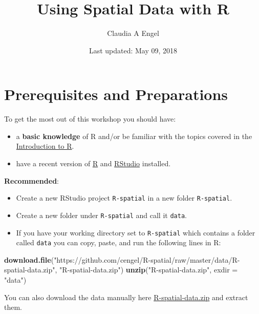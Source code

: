\documentclass[]{book}
\title{Using Spatial Data with R}
\author{Claudia A Engel}
\date{Last updated: May 09, 2018}
\newenvironment{Shaded}{\begin{snugshade}}{\end{snugshade}}
\newcommand{\KeywordTok}[1]{\textcolor[rgb]{0.13,0.29,0.53}{\textbf{#1}}}
\newcommand{\DataTypeTok}[1]{\textcolor[rgb]{0.13,0.29,0.53}{#1}}
\newcommand{\StringTok}[1]{\textcolor[rgb]{0.31,0.60,0.02}{#1}}
\newcommand{\NormalTok}[1]{#1}
\providecommand{\tightlist}{%
  \setlength{\itemsep}{0pt}\setlength{\parskip}{0pt}}
\theoremstyle{definition}
\theoremstyle{definition}
\theoremstyle{definition}
\theoremstyle{remark}
\begin{document}
\maketitle

{
\setcounter{tocdepth}{1}
\tableofcontents
}
\chapter*{Prerequisites and
Preparations}\label{prerequisites-and-preparations}

To get the most out of this workshop you should have:

\begin{itemize}
\tightlist
\item
  a \textbf{basic knowledge} of R and/or be familiar with the topics
  covered in the \href{https://cengel.github.io/R-intro/}{Introduction
  to R}.
\item
  have a recent version of \href{https://cran.r-project.org/}{R} and
  \href{https://www.rstudio.com/}{RStudio} installed.
\end{itemize}

\textbf{Recommended}:

\begin{itemize}
\item
  Create a new RStudio project \texttt{R-spatial} in a new folder
  \texttt{R-spatial}.
\item
  Create a new folder under \texttt{R-spatial} and call it
  \texttt{data}.
\item
  If you have your working directory set to \texttt{R-spatial} which
  contains a folder called \texttt{data} you can copy, paste, and run
  the following lines in R:
\end{itemize}

\begin{Shaded}
\begin{Highlighting}[]
\KeywordTok{download.file}\NormalTok{(}\StringTok{"https://github.com/cengel/R-spatial/raw/master/data/R-spatial-data.zip"}\NormalTok{, }
              \StringTok{"R-spatial-data.zip"}\NormalTok{)}
\KeywordTok{unzip}\NormalTok{(}\StringTok{"R-spatial-data.zip"}\NormalTok{, }\DataTypeTok{exdir =} \StringTok{"data"}\NormalTok{)}
\end{Highlighting}
\end{Shaded}

You can also download the data manually here
\href{https://github.com/cengel/R-spatial/raw/master/data/R-spatial-data.zip}{R-spatial-data.zip}
and extract them.
\end{document}
